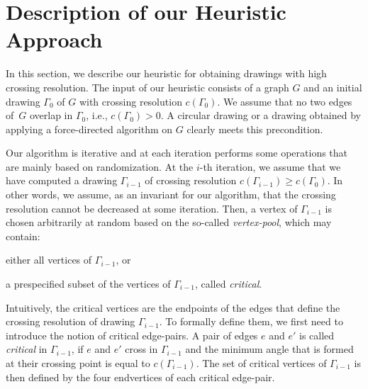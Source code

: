 \documentclass[runningheads]{llncs}
\begin{document}
\section{Description of our Heuristic Approach}
\label{sec:algorithm}

In this section, we describe our heuristic for obtaining drawings with high crossing resolution. The input of our heuristic consists of a graph $G$ and an initial drawing $\Gamma_0$ of $G$ with crossing resolution $c(\Gamma_0)$. We assume that no two edges of~$G$ overlap in $\Gamma_0$, i.e., $c(\Gamma_0)>0$. A circular drawing or a drawing obtained by applying a force-directed algorithm on $G$ clearly meets this precondition. 

Our algorithm is iterative and at each iteration performs some operations that are mainly based on randomization. At the $i$-th iteration, we assume that we have computed a drawing $\Gamma_{i-1}$ of crossing resolution $c(\Gamma_{i-1}) \geq c(\Gamma_0)$. 
In other words, we assume, as an invariant for our algorithm, that the crossing resolution cannot be decreased at some iteration. Then, a vertex of $\Gamma_{i-1}$ is chosen arbitrarily at random based on the so-called \emph{vertex-pool}, which may contain:
%
\begin{inparaenum}[(i)]
\item either all vertices of $\Gamma_{i-1}$, or
\item a prespecified subset of the vertices of $\Gamma_{i-1}$, called \emph{critical}.
\end{inparaenum}

Intuitively, the critical vertices are the endpoints of the edges that define the crossing resolution of drawing $\Gamma_{i-1}$. To formally define them, we first need to introduce the notion of critical edge-pairs. A pair of edges $e$ and $e'$ is called \emph{critical} in $\Gamma_{i-1}$, if $e$ and $e'$ cross in $\Gamma_{i-1}$ and the minimum angle that is formed at their crossing point is equal to $c(\Gamma_{i-1})$. The set of critical vertices of $\Gamma_{i-1}$ is then defined by the four endvertices of each critical edge-pair.  
\end{document}
